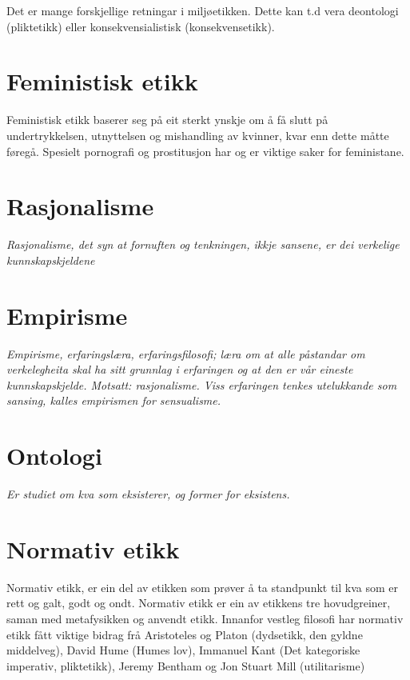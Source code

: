 \documentclass[a4paper]{IEEEtran}
\begin{document}
Det er mange forskjellige retningar i miljøetikken. Dette kan t.d vera deontologi (pliktetikk) eller konsekvensialistisk (konsekvensetikk). 

\section{Feministisk etikk}
\label{femimisme}\bigskip

Feministisk etikk baserer seg på eit sterkt ynskje om å få slutt på undertrykkelsen, utnyttelsen og mishandling av kvinner, kvar enn dette måtte føregå. Spesielt pornografi og prostitusjon har og er viktige saker for feministane. 

\section{Rasjonalisme}
\label{rasjonalisme}\bigskip

\textit{Rasjonalisme, det syn at fornuften og tenkningen, ikkje sansene, er dei verkelige kunnskapskjeldene}

\section{Empirisme}
\label{empirisme}\bigskip

\textit{Empirisme, erfaringslæra, erfaringsfilosofi; læra om at alle påstandar om verkelegheita skal ha sitt grunnlag i erfaringen og at den er vår eineste kunnskapskjelde. Motsatt: rasjonalisme. Viss erfaringen tenkes utelukkande som sansing, kalles empirismen for sensualisme.}
\section{Ontologi}
\label{ontolog}\bigskip

\textit{Er studiet om kva som eksisterer, og former for eksistens.}
\bigskip

\section{Normativ etikk}
\label{normativetikk}\bigskip

Normativ etikk, er ein del av etikken som prøver å ta standpunkt til kva som er rett og galt, godt og ondt. Normativ etikk er ein av etikkens tre hovudgreiner, saman med metafysikken og anvendt etikk. Innanfor vestleg filosofi har normativ etikk fått viktige bidrag frå Aristoteles og Platon (dydsetikk, den gyldne middelveg), David Hume (Humes lov), Immanuel Kant (Det kategoriske imperativ, pliktetikk), Jeremy Bentham og Jon Stuart Mill (utilitarisme)
\bigskip
\end{document}
